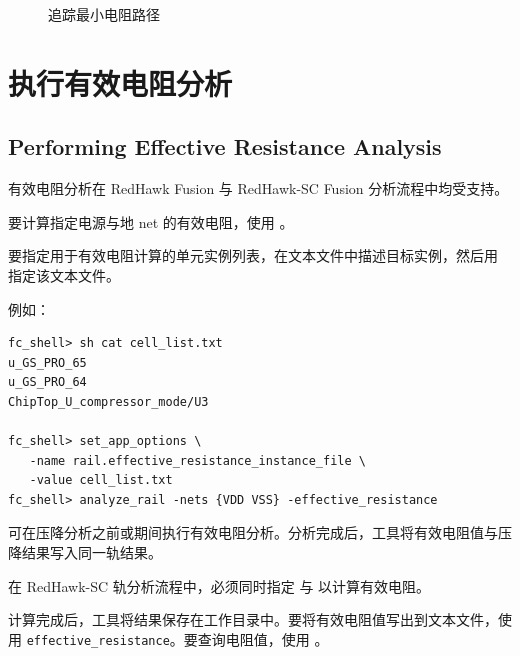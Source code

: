 \begin{figure}[htbp]
\centering
{}
\caption{追踪最小电阻路径}
\label{fig:mpr-trace-map}
\end{figure}

\section{执行有效电阻分析}
\subsection*{Performing Effective Resistance Analysis}

\begin{noteBox}
有效电阻分析在 RedHawk Fusion 与 RedHawk-SC Fusion 分析流程中均受支持。
\end{noteBox}

要计算指定电源与地 net 的有效电阻，使用  。

要指定用于有效电阻计算的单元实例列表，在文本文件中描述目标实例，然后用  指定该文本文件。

例如：
\begin{lstlisting}
fc_shell> sh cat cell_list.txt
u_GS_PRO_65
u_GS_PRO_64
ChipTop_U_compressor_mode/U3

fc_shell> set_app_options \
   -name rail.effective_resistance_instance_file \
   -value cell_list.txt
fc_shell> analyze_rail -nets {VDD VSS} -effective_resistance
\end{lstlisting}

可在压降分析之前或期间执行有效电阻分析。分析完成后，工具将有效电阻值与压降结果写入同一轨结果。

\begin{noteBox}
在 RedHawk-SC 轨分析流程中，必须同时指定  与  以计算有效电阻。
\end{noteBox}

计算完成后，工具将结果保存在工作目录中。要将有效电阻值写出到文本文件，使用   \texttt{effective\_resistance}。要查询电阻值，使用 。

